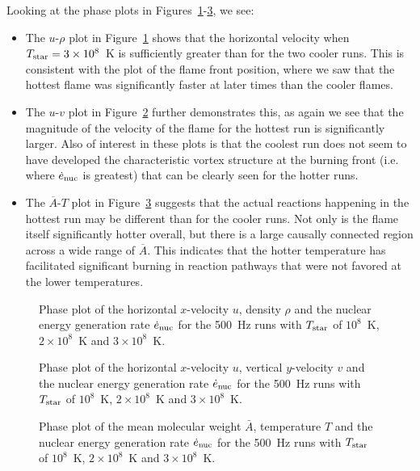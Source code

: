 \documentclass[preprint,times,tighten]{aastex63}
\begin{document}
Looking at the phase plots in Figures~\ref{fig:urho_hot}-\ref{fig:abar_hot}, we see:
\begin{itemize}
    \item The $u$-$\rho$ plot in Figure~\ref{fig:urho_hot} shows that the horizontal velocity when $T_{\rm star} = 3\times10^8$~K is sufficiently greater than for the two cooler runs. This is consistent with the plot of the flame front position, where we saw that the hottest flame was significantly faster at later times than the cooler flames.
    \item The $u$-$v$ plot in Figure~\ref{fig:uv_hot} further demonstrates this, as again we see that the magnitude of the velocity of the flame for the hottest run is significantly larger. Also of interest in these plots is that the coolest run does not seem to have developed the characteristic vortex structure at the burning front (i.e. where $\dot{e}_{\rm nuc}$ is greatest) that can be clearly seen for the hotter runs.
    \item The $\overline{A}$-$T$ plot in Figure~\ref{fig:abar_hot} suggests that the actual reactions happening in the hottest run may be different than for the cooler runs. Not only is the flame itself significantly hotter overall, but there is a large causally connected region across a wide range of $\overline{A}$. This indicates that the hotter temperature has facilitated significant burning in reaction pathways that were not favored at the lower temperatures.
\end{itemize}

\begin{figure}[t]
    \centering
    \caption{\label{fig:urho_hot}Phase plot of the horizontal $x$-velocity $u$, density $\rho$ and the nuclear energy generation rate $\dot{e}_{\rm nuc}$ for the 500~Hz runs with $T_{\rm star}$ of $10^8$~K, $2\times10^8$~K and $3\times10^8$~K.}
\end{figure}

\begin{figure}[t]
    \centering
    \caption{\label{fig:uv_hot}Phase plot of the horizontal $x$-velocity $u$, vertical $y$-velocity $v$ and the nuclear energy generation rate $\dot{e}_{\rm nuc}$ for the 500~Hz runs with $T_{\rm star}$ of $10^8$~K, $2\times10^8$~K and $3\times10^8$~K.}
\end{figure}

\begin{figure}[t]
    \centering
    \caption{\label{fig:abar_hot}Phase plot of the mean molecular weight $\bar{A}$, temperature $T$ and the nuclear energy generation rate $\dot{e}_{\rm nuc}$ for the 500~Hz runs with $T_{\rm star}$ of $10^8$~K, $2\times10^8$~K and $3\times10^8$~K.}
\end{figure}
\end{document}
